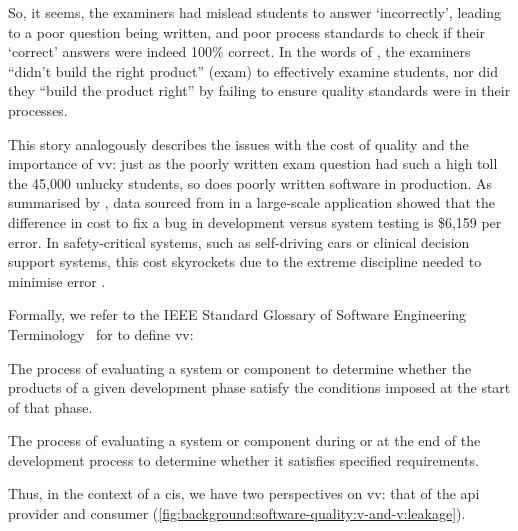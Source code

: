 So, it seems, the examiners had mislead students to answer `incorrectly', leading to a poor question being written, and poor process standards to check if their `correct' answers were indeed 100\% correct. In the words of \citet{Boehm:1981ua}, the examiners ``didn't build the right product'' (exam) to effectively examine students, nor did they ``build the product right'' by failing to ensure quality standards were in their processes. 

This story analogously describes the issues with the cost of quality \citep{Boehm:2005vj} and the importance of \gls{vv}: just as the poorly written exam question had such a high toll the 45,000 unlucky students, so does poorly written software in production. As summarised by \citet{Pressman:2005vf}, data sourced from \citet{Cigital:2003tl} in a large-scale application showed that the difference in cost to fix a bug in development versus system testing is \$6,159 per error. In safety-critical systems, such as self-driving cars or clinical decision support systems, this cost skyrockets due to the extreme discipline needed to minimise error \citep{Tassey:2002vu}.

Formally, we refer to the IEEE Standard Glossary of Software Engineering Terminology~\citep{IEEE:1990wp} for to define \gls{vv}:

\begin{samepage}
\begin{description}[font=\itshape,style=multiline,leftmargin=3cm]
  \item[verification] The process of evaluating a system or component to determine whether the products of a given development phase satisfy the conditions imposed at the start of that phase.
  \item[validation] The process of evaluating a system or component during or at the end of the development process to determine whether it satisfies specified requirements. 
\end{description} 
\end{samepage}

\noindent
Thus, in the context of a \gls{cis}, we have two perspectives on \gls{vv}: that of the \gls{api} provider and consumer (\cref{fig:background:software-quality:v-and-v:leakage}).

